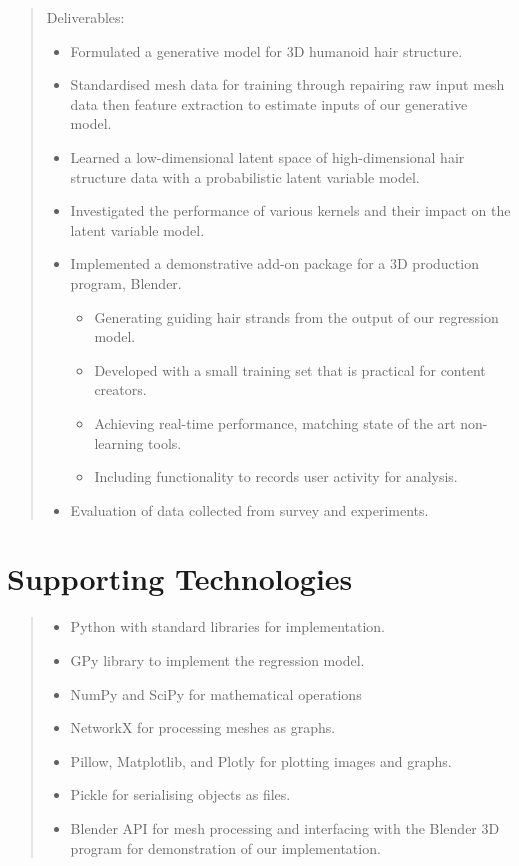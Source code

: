 \documentclass[ %
author={Dillon Keith Diep},
supervisor={Dr. Carl Henrik Ek},
degree={MEng},
title={ART-CG Hair:},
subtitle={Assisted Real-time Content Generation of Stylised Virtual Hair},
type={Research},
year={2017} ]{dissertation}
\begin{document}
\begin{quote}
	Deliverables:
	\begin{itemize}
		\item Formulated a generative model for 3D humanoid hair structure.
		\item Standardised mesh data for training through repairing raw input mesh data then feature extraction to estimate inputs of our generative model.
		\item Learned a low-dimensional latent space of high-dimensional hair structure data with a probabilistic latent variable model.
		\item Investigated the performance of various kernels and their impact on the latent variable model.
		\item Implemented a demonstrative add-on package for a 3D production program, Blender.
		\begin{itemize}
			\item Generating guiding hair strands from the output of our regression model.
			\item Developed with a small training set that is practical for content creators.
			\item Achieving real-time performance, matching state of the art non-learning tools.
			\item Including functionality to records user activity for analysis.
		\end{itemize}
		\item Evaluation of data collected from survey and experiments.
	\end{itemize}
\end{quote}


\chapter*{Supporting Technologies}

\begin{quote}
	\noindent
	\begin{itemize}
		\item Python with standard libraries for implementation.
		\item GPy library to implement the regression model.
		\item NumPy and SciPy for mathematical operations
		\item NetworkX for processing meshes as graphs.
		\item Pillow, Matplotlib, and Plotly for plotting images and graphs.
		\item Pickle for serialising objects as files.
		\item Blender API for mesh processing and interfacing with the Blender 3D program for demonstration of our implementation.
	\end{itemize}
\end{quote}
\end{document}
